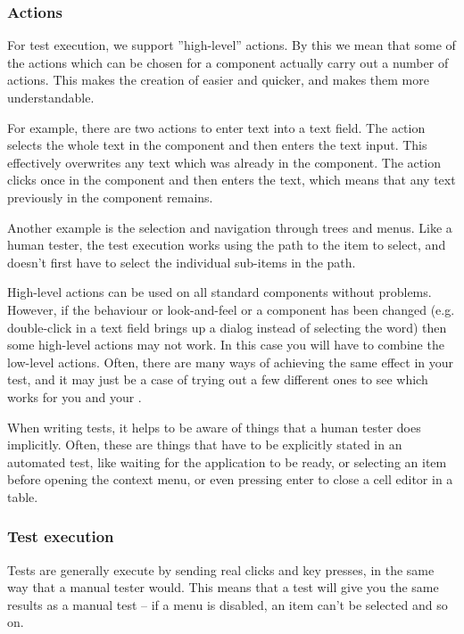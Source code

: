 \subsubsection{Actions}

For test execution, we  support ''high-level'' actions. By this we mean that some of the actions which can be chosen for a component actually carry out a number of actions. This makes the creation of \gdcases{} easier and quicker, and makes them more understandable. 

For example, there are two actions to enter text into a text field. The action  selects the whole text in the component and then enters the text input. This effectively overwrites any text which was already in the component. The  action clicks once in the component and then enters the text, which means that any text previously in the component remains. 

Another example is the selection and navigation through trees and menus. Like a human tester, the test execution works using the path to the item to select, and doesn't first have to select the individual sub-items in the path. 

High-level actions can be used on all standard components without problems. However, if the behaviour or look-and-feel or a component has been changed (e.g. double-click in a text field brings up a dialog instead of selecting the word) then some high-level actions may not work. In this case you will have to combine the low-level actions. Often, there are many ways of achieving the same effect in your test, and it may just be a case of trying out a few different ones to see which works for you and your \gdaut{}. 

When writing tests, it helps to be aware of things that a human tester does implicitly. Often, these are things that have to be explicitly stated in an automated test, like waiting for the application to be ready, or selecting an item before opening the context menu, or even pressing enter to close a cell editor in a table. 

\subsubsection{Test execution}
Tests are  generally execute by sending real clicks and key presses, in the same way that a manual tester would. This means that a test will give you the same results as a manual test -- if a menu is disabled, an item can't be selected and so on. 
 


